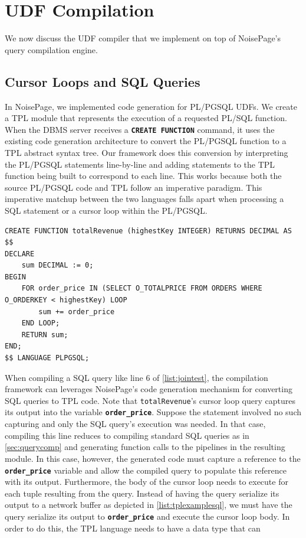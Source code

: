 \documentclass[12pt]{cmuthesis}
\newcommand{\sysname}{NoisePage\xspace}
\newcommand{\dbSQL}[1]{\texttt{\textbf{#1}}\xspace}
\begin{document}
\section{UDF Compilation}
We now discuss the UDF compiler that we implement on top of NoisePage's query compilation engine.


\subsection{Cursor Loops and SQL Queries}
\label{sec:cursor}

In \sysname, we implemented code generation for PL/PGSQL UDFs. We create a TPL module that represents the execution of a requested PL/SQL function. When the DBMS server receives a \dbSQL{CREATE FUNCTION} command, it uses the existing code generation architecture to convert the PL/PGSQL function to a TPL abstract syntax tree. Our framework does this conversion by interpreting the PL/PGSQL statements line-by-line and adding statements to the TPL function being built to correspond to each line. This works because both the source PL/PGSQL code and TPL follow an imperative paradigm. This imperative matchup between the two languages falls apart when processing a SQL statement or a cursor loop within the PL/PGSQL.\\

\begin{listing}
\begin{verbatim}
CREATE FUNCTION totalRevenue (highestKey INTEGER) RETURNS DECIMAL AS 
$$
DECLARE
    sum DECIMAL := 0;
BEGIN
    FOR order_price IN (SELECT O_TOTALPRICE FROM ORDERS WHERE O_ORDERKEY < highestKey) LOOP
        sum += order_price
    END LOOP;
    RETURN sum;
END;
$$ LANGUAGE PLPGSQL;
\end{verbatim}
\caption{Example of function with a cursor loop}
\label{list:jointest}
\end{listing}

When compiling a SQL query like line 6 of \cref{list:jointest}, the compilation framework can leverages \sysname's code generation mechanism for converting SQL queries to TPL code. Note that \texttt{totalRevenue}'s cursor loop query captures its output into the variable \dbSQL{order\_price}. Suppose the statement involved no such capturing and only the SQL query's execution was needed. In that case, compiling this line reduces to compiling standard SQL queries as in \cref{sec:querycomp} and generating function calls to the pipelines in the resulting module. In this case, however, the generated code must capture a reference to the \dbSQL{order\_price} variable and allow the compiled query to populate this reference with its output. Furthermore, the body of the cursor loop needs to execute for each tuple resulting from the query. Instead of having the query serialize its output to a network buffer as depicted in \cref{list:tplexamplesql}, we must have the query serialize its output to \dbSQL{order\_price} and execute the cursor loop body. In order to do this, the TPL language needs to have a data type that can 
\end{document}
